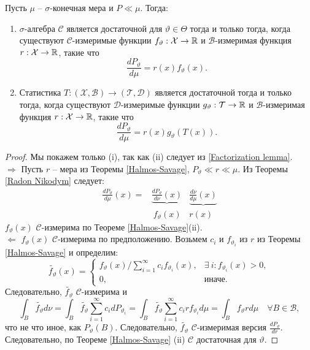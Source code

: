 \begin{thm} \label{Neyman criterion} Пусть $\mu$ -- $\sigma$-конечная мера и $P \ll \mu$. Тогда:
	\begin{enumerate}
		\item $\sigma$-алгебра $\mathcal{C}$ является достаточной для $\vartheta \in \Theta$ тогда и только тогда, когда существуют $\mathcal{C}$-измеримые функции $f_\vartheta:\mathcal{X} \rightarrow \mathbb{R}$ и $\mathcal{B}$-измеримая функция $r:\mathcal{X} \rightarrow \mathbb{R}$, такие что
		\[ \frac{dP_\vartheta}{d\mu}=r(x)f_\vartheta(x). \]
		\item Статистика $T:(\mathcal{X},\mathcal{B}) \rightarrow (\mathcal{T},\mathcal{D})$ является достаточной тогда и только тогда, когда существуют $\mathcal{D}$-измеримые функции $g_\vartheta:\mathcal{T} \rightarrow \mathbb{R}$ и $\mathcal{B}$-измеримая функция $r:\mathcal{X} \rightarrow \mathbb{R}$, такие что
		\[\frac{dP_\vartheta}{d\mu}=r(x)g_\vartheta(T(x)). \]
	\end{enumerate}
\end{thm}
\begin{proof}
	Мы покажем только (i), так как (ii) следует из \ref{Factorization lemma}. \\
	$\Longrightarrow$ Пусть $r$ -- мера из Теоремы \ref{Halmos-Savage}, $P_\vartheta \ll r \ll \mu$. Из Теоремы \ref{Radon Nikodym} следует:
	\[
	\begin{aligned}
	\frac{dP_\vartheta}{d \mu}(x) = & \underbrace{\frac{d P_\vartheta}{d \nu}(x)} & \underbrace{\frac{d \nu}{d \mu}(x)} \\
    &\ f_\vartheta(x) & r(x) \
	\end{aligned} \] 
	$f_\vartheta(x)$ $\mathcal{C}$-измерима по Теореме \ref{Halmos-Savage}(ii). \\
	$\Longleftarrow$
	$f_\vartheta(x)$ $\mathcal{C}$-измерима по предположению. Возьмем $c_i$ и $f_{\vartheta_i}$ из $r$ из Теоремы \ref{Halmos-Savage} и определим:
	\[ \widetilde{f_\vartheta}(x) =
	\left \{
	\begin{array}{cl}
	f_\vartheta(x) / \sum_{i=1}^{\infty} c_i f_{\vartheta_i}(x) , & \exists\ i: f_{\vartheta_i}(x) > 0, \\
	0, & \text{иначе}.
	\end{array}
	\right.
	\]
	Следовательно, $\widetilde{f_\vartheta}$ $\mathcal{C}$-измерима и
	\[ \int_B  \widetilde{f_\vartheta}d\nu = \int_B \widetilde{f_\vartheta} \sum_{i=1}^{\infty} c_i dP_{\vartheta_i} = \int_B \widetilde{f_\vartheta} \sum_{i=1}^{\infty} c_i r f_{\vartheta_i}d\mu = \int_B f_\vartheta r d\mu \quad \forall B \in \mathcal{B},  \]
	что не что иное, как $P_\vartheta(B)$. Следовательно, $\widetilde{f_\vartheta}$ $\mathcal{C}$-измеримая версия $\frac{dP_\vartheta}{dr}$. Следовательно, по Теореме \ref{Halmos-Savage} (ii) $\mathcal{C}$ достаточная для $\vartheta$.
\end{proof}

